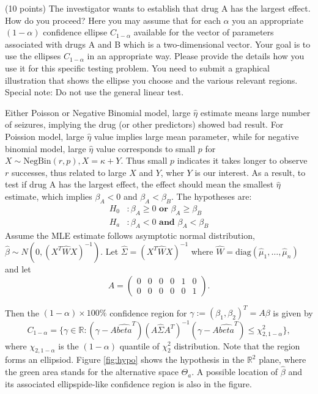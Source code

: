 \documentclass[11pt]{article}
\newcommand{\0}{{\mathbf{0}}}
\newcommand{\1}{{\mathbf{1}}}
\newcommand{\pr}[1]{\noindent{\bf #1.}}
\newcommand{\so}{\noindent{\textsc{Solution.\;\;}}}
\begin{document}
\pr{4} (10 points) The investigator wants to establish that drug A has the largest effect. How do you proceed? Here you may assume that for each $\alpha$ you an appropriate $(1-\alpha)$ confidence ellipse $C_{1-\alpha}$ available for the vector of parameters associated with drugs A and B which is a two-dimensional vector. Your goal is to use the ellipses $C_{1-\alpha}$ in an appropriate way. Please provide the details how you use it for this specific testing problem. You need to submit a graphical illustration that shows the ellipse you choose and the various relevant regions. Special note: Do not use the general linear test.

\so

Either Poisson or Negative Binomial model, large $\hat{\eta}$ estimate means large number of seizures, implying the drug (or other predictors) showed bad result. For Poission model, large $\hat{\eta}$ value implies large mean parameter, while for negative binomial model, large $\hat{\eta}$ value corresponds to small $p$ for $X\sim \text{NegBin}(r,p), X= \kappa + Y$. Thus small $p$ indicates it takes longer to observe $r$ successes, thus related to large $X$ and $Y$, wher $Y$ is our interest. As a result, to test if drug A has the largest effect, the effect should mean the smallest $\hat{\eta}$ estimate, which implies $\beta_A < 0$ and $\beta_A < \beta_B$. The hypotheses are:
\begin{align*}
H_0 &: \beta_A \ge 0 \textbf{ or } \beta_A \ge \beta_B\\
H_a &: \beta_A < 0 \textbf{ and } \beta_A < \beta_B
\end{align*}
Assume the MLE estimate follows asymptotic normal distribution, $\hat{\beta} \sim N(0, (X^T\hat{W}X)^{-1})$. Let $\hat{\Sigma} = (X^T\hat{W}X)^{-1}$ where $\hat{W} = \text{diag}(\hat{\mu}_1, \dots, \hat{\mu}_n)$ and let 
$$
A = \begin{pmatrix}
0 & 0 & 0 & 0 & 1 & 0\\
0 & 0 & 0 & 0 & 0 & 1
\end{pmatrix}.
$$

Then the $(1-\alpha)\times 100\%$ confidence region for $\gamma := (\beta_1, \beta_2)^T = A\beta$ is given by
$$
C_{1-\alpha} = \{ \gamma \in \mathbb{R} : (\gamma - A\hat{beta}^T)(A\hat{\Sigma}A^T)^{-1}(\gamma - A\hat{beta}^T) \le \chi_{2,1-\alpha}^2\},
$$
where $\chi_{2,1-\alpha}$ is the $(1-\alpha)$ quantile of $\chi_2^2$ distribution. Note that the region forms an ellipsiod. Figure \ref{fig:hypo} shows the hypothesis in the $\mathbb{R}^2$ plane, where the green area stands for the alternative space $\Theta_a$. A possible location of $\hat{\beta}$ and its associated ellipspide-like confidence region is also in the figure.
\end{document}
